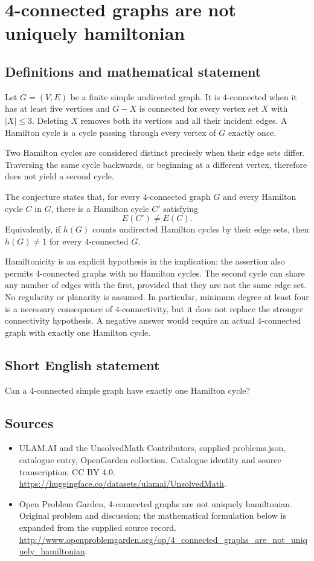 \documentclass[11pt,a4paper]{article}
\begin{document}
\section*{4-connected graphs are not uniquely hamiltonian}\label{statement}

\subsection{Definitions and mathematical statement}
Let $G=(V,E)$ be a finite simple undirected graph.
It is $4$-connected when it has at least five vertices
and $G-X$ is connected for every vertex set $X$ with
$|X|\leq3$. Deleting $X$ removes both its vertices and
all their incident edges. A Hamilton cycle is a cycle
passing through every vertex of $G$ exactly once.

Two Hamilton cycles are considered distinct precisely
when their edge sets differ. Traversing the same cycle
backwards, or beginning at a different vertex, therefore
does not yield a second cycle.

The conjecture states that, for every $4$-connected graph
$G$ and every Hamilton cycle $C$ in $G$, there is a
Hamilton cycle $C'$ satisfying
\[
 E(C')\neq E(C).
\]
Equivalently, if $h(G)$ counts undirected Hamilton cycles
by their edge sets, then $h(G)\neq1$ for every
$4$-connected $G$.

Hamiltonicity is an explicit hypothesis in the implication:
the assertion also permits $4$-connected graphs with no
Hamilton cycles. The second cycle can share any number
of edges with the first, provided that they are not the
same edge set. No regularity or planarity is assumed.
In particular, minimum degree at least four is a necessary
consequence of $4$-connectivity, but it does not replace
the stronger connectivity hypothesis. A negative answer
would require an actual $4$-connected graph with exactly
one Hamilton cycle.
\subsection{Short English statement}
Can a 4-connected simple graph have exactly one Hamilton cycle?
\subsection{Sources}
\begin{itemize}
\item[S1] ULAM.AI and the UnsolvedMath Contributors, supplied problems.json, catalogue entry, OpenGarden collection. Catalogue identity and source transcription; CC BY 4.0.
\url{https://huggingface.co/datasets/ulamai/UnsolvedMath}.
\item[S2] Open Problem Garden, 4-connected graphs are not uniquely hamiltonian. Original problem and discussion; the mathematical formulation below is expanded from the supplied source record.
\url{http://www.openproblemgarden.org/op/4_connected_graphs_are_not_uniquely_hamiltonian}.
\end{itemize}
\end{document}
